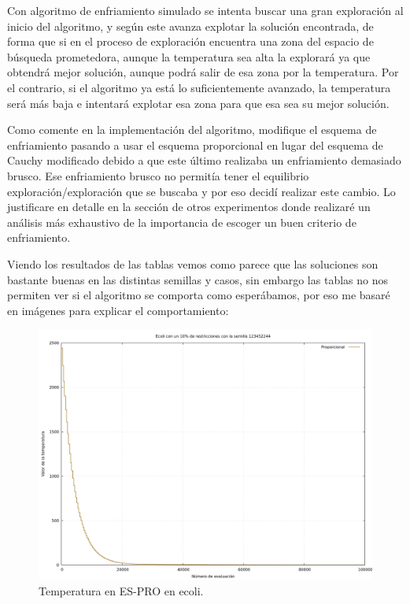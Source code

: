\documentclass[12pt, spanish]{article}
\begin{document}
Con  algoritmo de enfriamiento simulado se intenta buscar una gran exploración al inicio del algoritmo, y según este avanza explotar la solución encontrada, de forma que si en el proceso de exploración encuentra una zona del espacio de búsqueda prometedora, aunque la temperatura sea alta la explorará ya que obtendrá mejor solución, aunque podrá salir de esa zona por la temperatura. Por el contrario, si el algoritmo ya está lo suficientemente avanzado, la temperatura será más baja e intentará explotar esa zona para que esa sea su mejor solución.

Como comente en la implementación del algoritmo, modifique el esquema de enfriamiento pasando a usar el esquema proporcional en lugar del esquema de Cauchy modificado debido a que este último realizaba un enfriamiento demasiado brusco. Ese enfriamiento brusco no permitía tener el equilibrio exploración/exploración que se buscaba y por eso decidí realizar este cambio. Lo justificare en detalle en la sección de otros experimentos donde realizaré un análisis más exhaustivo de la importancia de escoger un buen criterio de enfriamiento.

Viendo los resultados de las tablas vemos como parece que las soluciones son bastante buenas en las distintas semillas y casos, sin embargo las tablas no nos permiten ver si el algoritmo se comporta como esperábamos, por eso me basaré en imágenes para explicar el comportamiento:

\begin{figure}[H]
	\centering
	\includegraphics[scale = 0.35]{es-temp-ecoli-10.png}
	
	\caption{Temperatura en ES-PRO en ecoli.}
	\label{fig:bmb-cmp2}
\end{figure}
\end{document}

